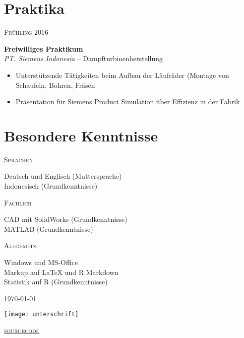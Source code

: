 \documentclass[a4paper]{article}
\newcommand{\entry}[4]{

	\begin{minipage}[t]{.20\textwidth}
		\hfill \textsc{#1}

	\end{minipage}
	\hfill\vline\hfill
	\begin{minipage}[t]{.75\textwidth}
		\textbf{#2}\\ 
		\textit{#3}    
		#4

	\end{minipage} 
	\vspace{.25cm}

}
\newcommand{\nentry}[2]{

	\begin{minipage}[t]{.20\textwidth}
		\hfill \textsc{#1}

	\end{minipage}
	\hfill\vline\hfill
	\begin{minipage}[t]{.75\textwidth}
		#2 

	\end{minipage}
	\vspace{.25cm} 

}
\begin{document}
\section{Praktika}

\entry{Fr{\"u}hling 2016}{Freiwilliges Praktikum}{PT. Siemens Indonesia}{-- Dampfturbinenherstellung\vspace{-.25cm} 
	\begin{itemize}[leftmargin=*]
		\setlength{\itemsep}{-3pt}
		\item Unterst{\"u}tzende T{\"a}tigkeiten beim Aufbau der L{\"a}ufr{\"a}der \newline \phantom{W}(Montage von Schaufeln, Bohren, Fr{\"a}sen
		\item Pr{\"a}sentation f{\"u}r Siemens Product Simulation {\"u}ber Effizienz in der Fabrik
	\end{itemize}	
}

\section{Besondere Kenntnisse}

\nentry{Sprachen}{Deutsch und Englisch (Muttersprache)\\Indonesisch (Grundkenntnisse)}

\nentry{Fachlich}{CAD mit SolidWorks (Grundkenntnisse)\\MATLAB (Grundkenntnisse)}

\nentry{Allgemein}{Windows und MS-Office\\Markup auf {\LaTeX} und R Markdown\\Statistik auf R (Grundkenntnisse)}

\vspace*{\fill} 
\begin{minipage}{0.4\textwidth}
	\today
\end{minipage}
\begin{minipage}{0.19\textwidth}
	\centering
	\hspace{-50mm}\texttt{[image: unterschrift]}
\end{minipage}
\begin{minipage}{0.4\textwidth}
	\flushright
	\href{https://github.com/emfiedler/cv/blob/master/CV.tex}{\textsc{sourcecode}}
\end{minipage}
\end{document}
